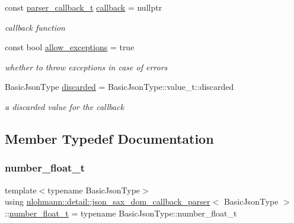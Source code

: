 \begin{DoxyCompactItemize}
const \mbox{\hyperlink{classnlohmann_1_1detail_1_1json__sax__dom__callback__parser_a4f636086fa8e7cf26c35c8afd50903ce}{parser\+\_\+callback\+\_\+t}} \mbox{\hyperlink{classnlohmann_1_1detail_1_1json__sax__dom__callback__parser_a46a72dffd5be4a25602af00f0033c126}{callback}} = nullptr
\begin{DoxyCompactList}\small\item\em callback function \end{DoxyCompactList}\item 
const bool \mbox{\hyperlink{classnlohmann_1_1detail_1_1json__sax__dom__callback__parser_a0a1390c23e2a3da774d75c050f9b3f13}{allow\+\_\+exceptions}} = true
\begin{DoxyCompactList}\small\item\em whether to throw exceptions in case of errors \end{DoxyCompactList}\item 
Basic\+Json\+Type \mbox{\hyperlink{classnlohmann_1_1detail_1_1json__sax__dom__callback__parser_a8997ee6dc3bd39116b951465b946445e}{discarded}} = Basic\+Json\+Type\+::value\+\_\+t\+::discarded
\begin{DoxyCompactList}\small\item\em a discarded value for the callback \end{DoxyCompactList}\end{DoxyCompactItemize}


\subsection{Member Typedef Documentation}
\mbox{\label{classnlohmann_1_1detail_1_1json__sax__dom__callback__parser_a914ea0555cea5290449fb791ae41c655}} 
\subsubsection{\texorpdfstring{number\_float\_t}{number\_float\_t}}
{\footnotesize\ttfamily template$<$typename Basic\+Json\+Type$>$ \\
using \mbox{\hyperlink{classnlohmann_1_1detail_1_1json__sax__dom__callback__parser}{nlohmann\+::detail\+::json\+\_\+sax\+\_\+dom\+\_\+callback\+\_\+parser}}$<$ Basic\+Json\+Type $>$\+::\mbox{\hyperlink{classnlohmann_1_1detail_1_1json__sax__dom__callback__parser_a914ea0555cea5290449fb791ae41c655}{number\+\_\+float\+\_\+t}} =  typename Basic\+Json\+Type\+::number\+\_\+float\+\_\+t}

